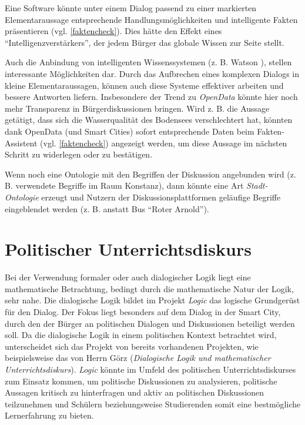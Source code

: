 \documentclass[11pt,a4paper,bibtotocnumbered]{scrreprt}
\begin{document}
Eine Software könnte unter einem Dialog passend zu einer markierten Elementaraussage entsprechende Handlungsmöglichkeiten und intelligente Fakten präsentieren (vgl. \autoref{faktencheck}).
Dies hätte den Effekt eines \enquote{Intelligenzverstärkers}, der jedem Bürger das globale Wissen zur Seite stellt.

Auch die Anbindung von intelligenten Wissenssystemen (z. B. Watson \cite{Watson}), stellen interessante Möglichkeiten dar.
Durch das Aufbrechen eines komplexen Dialogs in kleine Elementaraussagen, können auch diese Systeme effektiver arbeiten und bessere Antworten liefern.
Insbesondere der Trend zu \emph{OpenData} könnte hier noch mehr Transparenz in Bürgerdiskussionen bringen.
Wird z. B. die Aussage getätigt, dass sich die Wasserqualität des Bodensees verschlechtert hat, könnten dank OpenData (und Smart Cities) sofort entsprechende Daten beim Fakten-Assistent (vgl. \autoref{faktencheck}) angezeigt werden, um diese Aussage im nächsten Schritt zu widerlegen oder zu bestätigen.

Wenn noch eine Ontologie mit den Begriffen der Diskussion angebunden wird (z. B. verwendete Begriffe im Raum Konstanz), dann könnte eine Art \emph{Stadt-Ontologie} erzeugt und Nutzern der Diskussionsplattformen geläufige Begriffe eingeblendet werden (z. B. anstatt Bus \enquote{Roter Arnold}).


\section{Politischer Unterrichtsdiskurs} %
Bei der Verwendung formaler oder auch dialogischer Logik liegt eine mathematische Betrachtung, bedingt durch die mathematische Natur der Logik, sehr nahe. 
Die dialogische Logik bildet im Projekt \textit{Logic} das logische Grundgerüst für den Dialog. Der Fokus liegt besonders auf dem Dialog in der Smart City, durch den der Bürger an politischen Dialogen und Diskussionen beteiligt werden soll.
Da die dialogische Logik in einem politischen Kontext betrachtet wird, unterscheidet sich das Projekt von bereits vorhandenen Projekten, wie beispielsweise das von Herrn Görz (\textit{Dialogische Logik und mathematischer Unterrichtsdiskurs}).
\textit{Logic} könnte im Umfeld des politischen Unterrichtsdiskurses zum Einsatz kommen, um politische Diskussionen zu analysieren, politische Aussagen kritisch zu hinterfragen und aktiv an politischen Diskussionen teilzunehmen und Schülern beziehungsweise Studierenden somit eine bestmögliche Lernerfahrung zu bieten.
\end{document}
